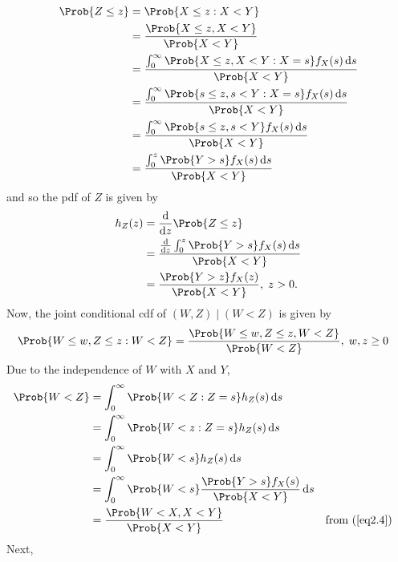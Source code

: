 \begin{Example}
    \begin{align*}
        \Prob{Z\le z}
         & =\Prob{X\le z\given X<Y}                                                       \\
         & =\frac{\Prob{X\le z,X<Y}}{\Prob{X<Y}}                                          \\
         & =\frac{\int_{0}^{\infty}\Prob{X\le z,X<Y\given X=s}f_X(s)\odif{s}}{\Prob{X<Y}} \\
         & =\frac{\int_{0}^{\infty}\Prob{s\le z,s<Y\given X=s}f_X(s)\odif{s}}{\Prob{X<Y}} \\
         & =\frac{\int_{0}^{\infty}\Prob{s\le z,s<Y}f_X(s)\odif{s}}{\Prob{X<Y}}           \\
         & =\frac{\int_{0}^{z}\Prob{Y>s}f_X(s)\odif{s}}{\Prob{X<Y}}
    \end{align*}
    and so the pdf of $ Z $ is given by
    \begin{align*}
        h_Z(z)
         & =\odv*{\Prob{Z\le z}}{z}                                           \\
         & =\frac{\odv*{\int_{0}^{z}\Prob{Y>s}f_X(s)\odif{s}}{z}}{\Prob{X<Y}} \\
         & =\frac{\Prob{Y>z}f_X(z)}{\Prob{X<Y}},\; z>0.
    \end{align*}
    Now, the joint conditional cdf of $ (W,Z)\mid(W<Z) $ is given by
    \begin{align*}
        \Prob{W\le w,Z\le z\given W<Z}
         & =\frac{\Prob{W\le w,Z\le z,W<Z}}{\Prob{W<Z}},\; w,z\ge 0
    \end{align*}
    Due to the independence of $ W $ with $ X $ and $ Y $,
    \begin{align*}
        \Prob{W<Z}
         & =\int_{0}^{\infty}\Prob{W<Z\given Z=s}h_Z(s)\odif{s}                                                   \\
         & =\int_{0}^{\infty}\Prob{W<z\given Z=s}h_Z(s)\odif{s}                                                   \\
         & =\int_{0}^{\infty}\Prob{W<s}h_Z(s)\odif{s}                                                             \\
         & =\int_{0}^{\infty}\Prob{W<s}\frac{\Prob{Y>s}f_X(s)}{\Prob{X<Y}}\odif{s}                                \\
         & =\frac{\Prob{W<X,X<Y}}{\Prob{X<Y}}                                      &  & \text{from (\ref{eq2.4})}
    \end{align*}
    Next,
    \begin{align*}

\end{align*}
\end{Example}
